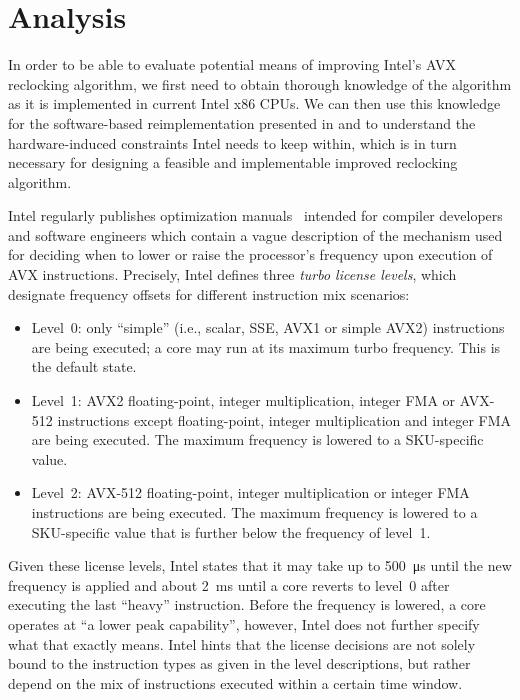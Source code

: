 \chapter{Analysis}
\label{sec:analysis}

In order to be able to evaluate potential means of improving Intel's \gls{AVX} reclocking algorithm, we first need to obtain thorough knowledge of the algorithm as it is implemented in current Intel x86 \glspl{CPU}. We can then use this knowledge for the software-based reimplementation presented in  and to understand the hardware-induced constraints Intel needs to keep within, which is in turn necessary for designing a feasible and implementable improved reclocking algorithm.

Intel regularly publishes optimization manuals~\cite{inteloptimizationmanual} intended for compiler developers and software engineers which contain a vague description of the mechanism used for deciding when to lower or raise the processor's frequency upon execution of \gls{AVX} instructions. Precisely, Intel defines three \textit{turbo license levels}, which designate frequency offsets for different instruction mix scenarios:

\begin{itemize}
	\item Level~0: only \enquote{simple} (i.e., scalar, \gls{SSE}, \gls{AVX1} or simple \gls{AVX2}) instructions are being executed; a core may run at its maximum turbo frequency. This is the default state.
	\item Level~1: \gls{AVX2} floating-point, integer multiplication, integer \gls{FMA} or \gls{AVX-512} instructions except floating-point, integer multiplication and integer \gls{FMA} are being executed. The maximum frequency is lowered to a \gls{SKU}-specific value.
	\item Level~2: \gls{AVX-512} floating-point, integer multiplication  or integer \gls{FMA} instructions are being executed. The maximum frequency is lowered to a \gls{SKU}-specific value that is further below the frequency of level~1.
\end{itemize}

Given these license levels, Intel states that it may take up to \SI{500}{\micro\second} until the new frequency is applied and about \SI{2}{\milli\second} until a core reverts to level~0 after executing the last \enquote{heavy} instruction. Before the frequency is lowered, a core operates at \enquote{a lower peak capability}, however, Intel does not further specify what that exactly means. Intel hints that the license decisions are not solely bound to the instruction types as given in the level descriptions, but rather depend on the mix of instructions executed within a certain time window.

